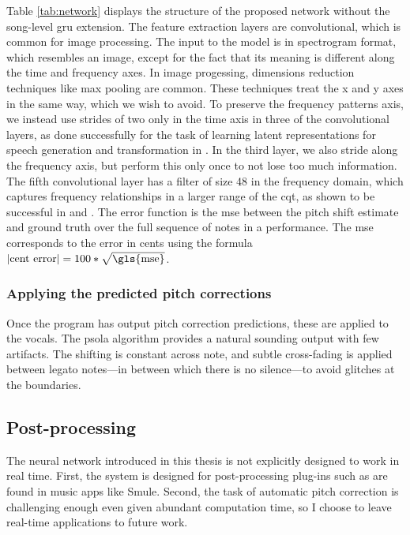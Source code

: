 Table \ref{tab:network} displays the structure of the proposed network without the song-level \gls{gru} extension. The feature extraction layers are convolutional, which is common for image processing. The input to the model is in spectrogram format, which resembles an image, except for the fact that its meaning is different along the time and frequency axes. In image progessing, dimensions reduction techniques like max pooling are common. These techniques treat the x and y axes in the same way, which we wish to avoid. To preserve the frequency patterns axis, we instead use strides of two only in the time axis in three of the convolutional layers, as done successfully for the task of learning latent representations for speech generation and transformation in \cite{hsu2017learning}. In the third layer, we also stride along the frequency axis, but perform this only once to not lose too much information. The fifth convolutional layer has a filter of size 48 in the frequency domain, which captures frequency relationships in a larger range of the \gls{cqt}, as shown to be successful in \cite{bittner2017deep} and \cite{hsu2017learning}. 
The error function is the \gls{mse} between the pitch shift estimate and ground truth over the full sequence of notes in a performance. The \gls{mse} corresponds to the error in cents using the formula $\left|\text{cent error}\right| = 100 * \sqrt{\text{\gls{mse}}}$. %

\subsubsection{Applying the predicted pitch corrections}
Once the program has output pitch correction predictions, these are applied to the vocals. The \gls{psola} algorithm provides a natural sounding output with few artifacts. The shifting is constant across note, and subtle cross-fading is applied between legato notes---in between which there is no silence---to avoid glitches at the boundaries.

\subsection{Post-processing}
The neural network introduced in this thesis is not explicitly designed to work in real time. First, the system is designed for post-processing plug-ins such as are found in music apps like Smule. Second, the task of automatic pitch correction is challenging enough even given abundant computation time, so I choose to leave real-time applications to future work. 

